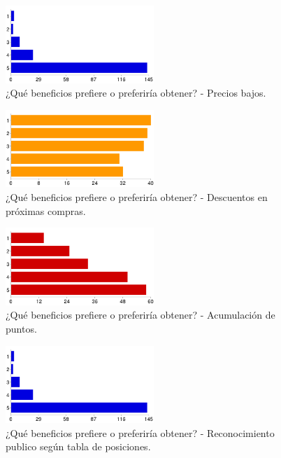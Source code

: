 \begin{figure}[!htb]
  \centering
  \includegraphics[width=0.5\textwidth]{images/chartPreg7_1.png}
  \caption[chart7-1]{¿Qué beneficios prefiere o preferiría obtener? - Precios bajos.}
  \label{fig:chart2}
\end{figure}

\begin{figure}[!htb]
  \centering
  \includegraphics[width=0.5\textwidth]{images/chartPreg7_2.png}
  \caption[chart7-2]{¿Qué beneficios prefiere o preferiría obtener? - Descuentos en próximas compras.}
  \label{fig:chart2}
\end{figure}

\begin{figure}[!htb]
  \centering
  \includegraphics[width=0.5\textwidth]{images/chartPreg7_3.png}
  \caption[chart7-3]{¿Qué beneficios prefiere o preferiría obtener? - Acumulación de puntos.}
  \label{fig:chart2}
\end{figure}

\begin{figure}[!htb]
  \centering
  \includegraphics[width=0.5\textwidth]{images/chartPreg7_1.png}
  \caption[chart7-4]{¿Qué beneficios prefiere o preferiría obtener? - Reconocimiento publico según tabla de posiciones.}
  \label{fig:chart2}
\end{figure}

